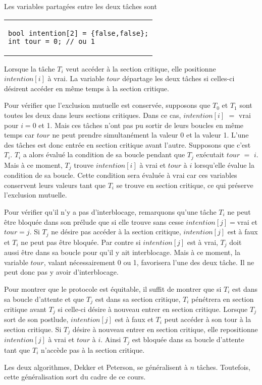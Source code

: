 Les variables partagées entre les deux tâches sont
\begin{center}
\begin{tabular}{l}
  \lstset{language=C++}
\begin{lstlisting}
bool intention[2] = {false,false};
int tour = 0; // ou 1
\end{lstlisting}
\end{tabular}
\end{center}

\par\noindent
Lorsque la tâche $T_i$ veut accéder à la section critique, elle positionne $intention[i]$ à vrai.  La variable $tour$ départage les deux tâches si celles-ci désirent accéder en même temps à la section critique.
\par
Pour vérifier que l'exclusion mutuelle est conservée, supposons que $T_0$ et $T_1$ sont toutes les deux dans leurs sections critiques.
Dans ce cas, $intention[i]$ $=$ vrai pour $i = 0$ et 1.  Mais ces tâches n'ont pas pu sortir de leurs boucles en même temps car $tour$ ne peut prendre simultanément la valeur 0 et la valeur 1.  L'une des tâches est donc entrée en section critique avant l'autre. Supposons que c'est $T_i$. $T_i$ a alors évalué la condition de sa boucle pendant que $T_j$ exécutait $tour$ $=$ $i$.  Mais à ce moment, $T_j$ trouve $intention[i]$ à vrai et $tour$ à $i$ lorsqu'elle évalue la condition de sa boucle.
Cette condition sera évaluée à vrai car ces variables conservent leurs valeurs tant que $T_i$ se trouve en section critique, ce qui préserve l'exclusion mutuelle.
\par
Pour vérifier qu'il n'y a pas d'interblocage, remarquons qu'une tâche $T_i$ ne peut être bloquée dans son prélude que si elle trouve sans cesse $intention[j]=$vrai et $tour=j$.  Si $T_j$ ne désire pas accéder à la section critique, $intention[j]$ est à faux et $T_i$ ne peut pas être bloquée.  Par contre si $intention[j]$ est à vrai, $T_j$ doit aussi être dans sa boucle pour qu'il y ait interblocage.  Mais à ce moment, la variable $tour$, valant nécessairement 0 ou 1, favorisera l'une des deux tâche.  Il ne peut donc pas y avoir d'interblocage.
\par
Pour montrer que le protocole est équitable, il suffit de montrer que si $T_i$ est dans sa boucle d'attente et que $T_j$ est dans sa section critique, $T_i$ pénétrera en section critique avant $T_j$ si celle-ci désire à nouveau entrer en section critique.  Lorsque $T_j$ sort de son postlude, $intention[j]$ est à faux et $T_i$ peut accéder à son tour à la section critique.  Si $T_j$ désire à nouveau entrer en section critique, elle repositionne $intention[j]$ à vrai et $tour$ à $i$.  Ainsi $T_j$ est bloquée dans sa boucle d'attente tant que $T_i$ n'accède pas à la section critique.
\par
Les deux algorithmes, Dekker et Peterson, se généralisent à $n$ tâches. Toutefois, cette généralisation sort du cadre de ce cours.

